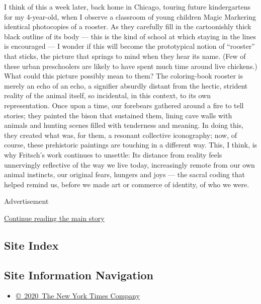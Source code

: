 I think of this a week later, back home in Chicago, touring future
kindergartens for my 4-year-old, when I observe a classroom of young
children Magic Markering identical photocopies of a rooster. As they
carefully fill in the cartoonishly thick black outline of its body ---
this is the kind of school at which staying in the lines is encouraged
--- I wonder if this will become the prototypical notion of ``rooster''
that sticks, the picture that springs to mind when they hear its name.
(Few of these urban preschoolers are likely to have spent much time
around live chickens.) What could this picture possibly mean to them?
The coloring-book rooster is merely an echo of an echo, a signifier
absurdly distant from the hectic, strident reality of the animal itself,
so incidental, in this context, to its own representation. Once upon a
time, our forebears gathered around a fire to tell stories; they painted
the bison that sustained them, lining cave walls with animals and
hunting scenes filled with tenderness and meaning. In doing this, they
created what was, for them, a resonant collective iconography; now, of
course, these prehistoric paintings are touching in a different way.
This, I think, is why Fritsch's work continues to unsettle: Its distance
from reality feels unnervingly reflective of the way we live today,
increasingly remote from our own animal instincts, our original fears,
hungers and joys --- the sacral coding that helped remind us, before we
made art or commerce of identity, of who we were.

Advertisement

\protect\hyperlink{after-bottom}{Continue reading the main story}

\hypertarget{site-index}{%
\subsection{Site Index}\label{site-index}}

\hypertarget{site-information-navigation}{%
\subsection{Site Information
Navigation}\label{site-information-navigation}}

\begin{itemize}
\tightlist
\item
  \href{https://help.nytimes3xbfgragh.onion/hc/en-us/articles/115014792127-Copyright-notice}{©~2020~The
  New York Times Company}
\end{itemize}

